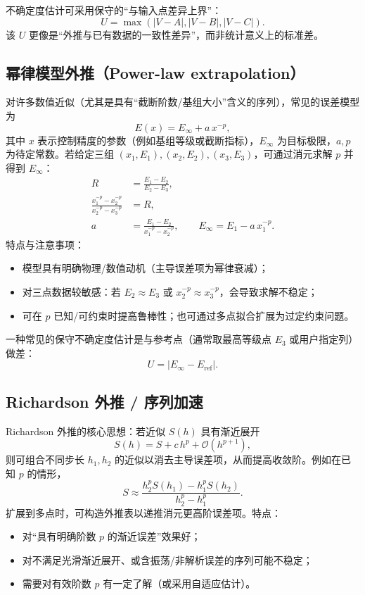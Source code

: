 \documentclass[UTF8,a4paper,11pt]{ctexart}
\begin{document}
不确定度估计可采用保守的“与输入点差异上界”：
\begin{equation}
U=\max\left(|V-A|,|V-B|,|V-C|\right).
\end{equation}
该 $U$ 更像是“外推与已有数据的一致性差异”，而非统计意义上的标准差。

\subsection{幂律模型外推（Power-law extrapolation）}

对许多数值近似（尤其是具有“截断阶数/基组大小”含义的序列），常见的误差模型为
\begin{equation}
E(x) = E_\infty + a\,x^{-p},
\end{equation}
其中 $x$ 表示控制精度的参数（例如基组等级或截断指标），$E_\infty$ 为目标极限，$a,p$ 为待定常数。若给定三组 $(x_1,E_1),(x_2,E_2),(x_3,E_3)$，可通过消元求解 $p$ 并得到 $E_\infty$：
\begin{align}
R &= \frac{E_1-E_2}{E_2-E_3},\\
\frac{x_1^{-p}-x_2^{-p}}{x_2^{-p}-x_3^{-p}} &= R,\\
a &= \frac{E_1-E_2}{x_1^{-p}-x_2^{-p}},\qquad
E_\infty = E_1 - a\,x_1^{-p}.
\end{align}
特点与注意事项：
\begin{itemize}
  \item 模型具有明确物理/数值动机（主导误差项为幂律衰减）；
  \item 对三点数据较敏感：若 $E_2\approx E_3$ 或 $x_2^{-p}\approx x_3^{-p}$，会导致求解不稳定；
  \item 可在 $p$ 已知/可约束时提高鲁棒性；也可通过多点拟合扩展为过定约束问题。
\end{itemize}

一种常见的保守不确定度估计是与参考点（通常取最高等级点 $E_3$ 或用户指定列）做差：
\begin{equation}
U = |E_\infty - E_{\mathrm{ref}}|.
\end{equation}

\subsection{Richardson 外推 / 序列加速}

Richardson 外推的核心思想：若近似 $S(h)$ 具有渐近展开
\begin{equation}
S(h)=S + c\,h^p + \mathcal{O}(h^{p+1}),
\end{equation}
则可组合不同步长 $h_1,h_2$ 的近似以消去主导误差项，从而提高收敛阶。例如在已知 $p$ 的情形，
\begin{equation}
S \approx \frac{h_2^p S(h_1) - h_1^p S(h_2)}{h_2^p - h_1^p}.
\end{equation}
扩展到多点时，可构造外推表以递推消元更高阶误差项。特点：
\begin{itemize}
  \item 对“具有明确阶数 $p$ 的渐近误差”效果好；
  \item 对不满足光滑渐近展开、或含振荡/非解析误差的序列可能不稳定；
  \item 需要对有效阶数 $p$ 有一定了解（或采用自适应估计）。
\end{itemize}
\end{document}

